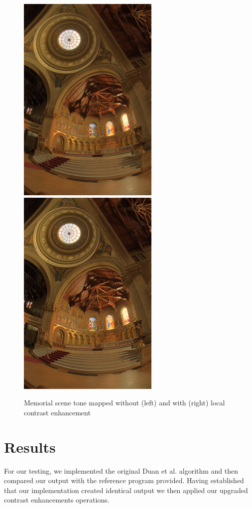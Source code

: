 \documentclass[twocolumn]{article}
\begin{document}
\begin{figure}[h!]
	\centering
	\includegraphics[scale=0.5]{memorial_no_contrast}
	\includegraphics[scale=0.5]{memorial_contrast}
	\caption{Memorial scene tone mapped without (left) and with (right)  local contrast enhancement}
\end{figure}

\section{Results}

For our testing, we implemented the original Duan et al. algorithm and then compared our output with the reference program provided. Having established that our implementation created identical output we then applied our upgraded contrast enhancements operations.
\end{document}
